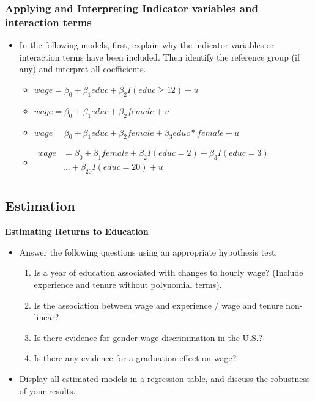 \documentclass[
]{book}
\providecommand{\tightlist}{%
  \setlength{\itemsep}{0pt}\setlength{\parskip}{0pt}}
\theoremstyle{definition}
\theoremstyle{definition}
\theoremstyle{definition}
\theoremstyle{definition}
\theoremstyle{remark}
\begin{document}
\subsubsection{Applying and Interpreting Indicator variables and interaction terms}\label{applying-and-interpreting-indicator-variables-and-interaction-terms}

\begin{itemize}
\item
  In the following models, first, explain why the indicator variables or interaction terms have been included. Then identify the reference group (if any) and interpret all coefficients.

  \begin{itemize}
  \item
    \(wage = \beta_0 + \beta_1 educ + \beta_2 I(educ \geq 12) + u\)
  \item
    \(wage = \beta_0 + \beta_1 educ + \beta_2 female + u\)
  \item
    \(wage = \beta_0 + \beta_1 educ + \beta_2 female + \beta_3 educ*female + u\)
  \item
    \(\begin{aligned}
    wage &= \beta_0 + \beta_1 female + \beta_2 I(educ = 2) + \beta_3 I(educ = 3)\\
    &...+ \beta_{20} I(educ = 20) + u\\
    \end{aligned}\)
  \end{itemize}
\end{itemize}

\subsection{Estimation}\label{estimation}

\textbf{Estimating Returns to Education}

\begin{itemize}
\tightlist
\item
  Answer the following questions using an appropriate hypothesis test.

  \begin{enumerate}
  \def\labelenumi{\arabic{enumi}.}
  \tightlist
  \item
    Is a year of education associated with changes to hourly wage? (Include experience and tenure without polynomial terms).
  \item
    Is the association between wage and experience / wage and tenure non-linear?
  \item
    Is there evidence for gender wage discrimination in the U.S.?
  \item
    Is there any evidence for a graduation effect on wage?
  \end{enumerate}
\item
  Display all estimated models in a regression table, and discuss the robustness of your results.
\end{itemize}
\end{document}
